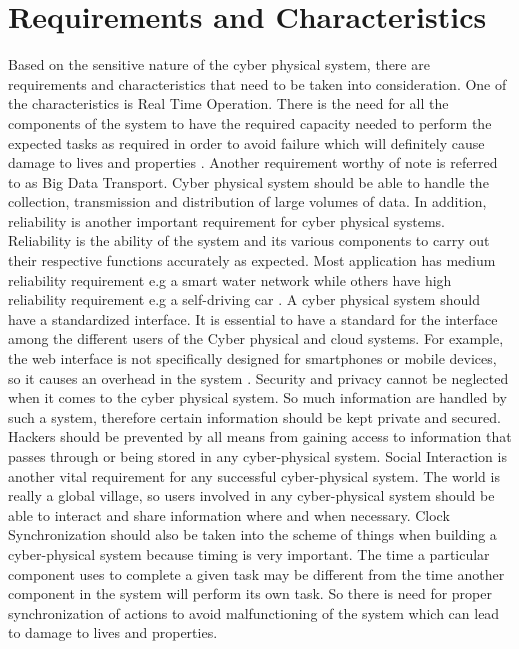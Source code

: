 \documentclass[english]{lni}
\begin{document}
\section{Requirements and Characteristics}
Based on the sensitive nature of the cyber physical system, there are  requirements and characteristics that need to be taken into consideration. One of the characteristics is Real Time Operation. There is the need for all the components of the system to have the required capacity needed to perform the expected tasks as required in order to avoid failure which will definitely cause damage  to lives and properties \cite{copyurl3}. Another requirement worthy of note is referred to as Big Data Transport. Cyber physical system should be able to  handle the collection, transmission and distribution of large volumes of data. In addition, reliability is another important requirement for cyber physical systems. Reliability is the ability of the  system  and its various components to carry out their respective functions  accurately as expected.
Most application has medium reliability requirement e.g a smart water network while others have high reliability requirement e.g a self-driving car \cite{b2}.  A cyber physical system should have a standardized interface. It is essential to have a standard for the interface among the different users of the  Cyber physical and cloud systems. For example, the web interface is not specifically designed for smartphones or mobile devices, so it causes an overhead in the system \cite{copyurl2}. Security and privacy cannot be neglected when it comes to the cyber physical system. So much information are handled by such a system, therefore certain information should be kept private and secured. Hackers should be prevented by all means from gaining access to information that passes through or being  stored in any cyber-physical system. Social Interaction is another vital requirement for any successful cyber-physical system. The world is really a global village, so users involved in any cyber-physical system should be able to interact and share information where and when necessary. Clock Synchronization should also be taken into the scheme of things when building a cyber-physical system because timing is very important. The time a particular component uses to  complete a given task may be different from the time another component in the system will perform its own task. So there is need for proper synchronization of actions to avoid malfunctioning of the system which can lead to damage to lives and properties.
\end{document}
